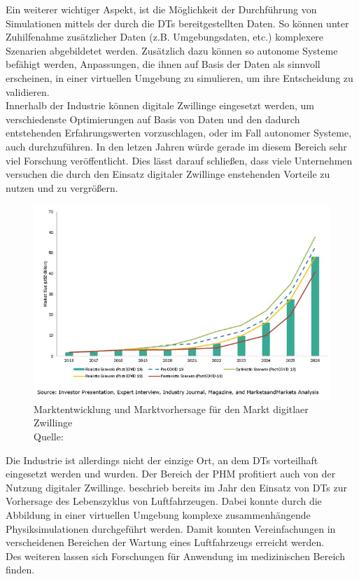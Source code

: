 Ein weiterer wichtiger Aspekt, ist die Möglichkeit der Durchführung von Simulationen mittels der durch die \ac{DT}s bereitgestellten Daten. So können unter Zuhilfenahme zusätzlicher Daten (z.B. Umgebungsdaten, etc.) komplexere Szenarien abgebildetet werden. Zusätzlich dazu können so autonome Systeme befähigt werden, Anpassungen, die ihnen auf Basis der Daten als sinnvoll erscheinen, in einer virtuellen Umgebung zu simulieren, um ihre Entscheidung zu validieren. \autocite{rosen2015importance}\\
Innerhalb der Industrie können digitale Zwillinge eingesetzt werden, um verschiedenste Optimierungen auf Basis von Daten und den dadurch entstehenden Erfahrungswerten vorzuschlagen, oder im Fall autonomer Systeme, auch durchzuführen. In den letzen Jahren würde gerade im diesem Bereich sehr viel Forschung veröffentlicht. \autocite[S. 167657]{barricelli2019survey} Dies lässt darauf schließen, dass viele Unternehmen versuchen die durch den Einsatz digitaler Zwillinge enstehenden Vorteile zu nutzen und zu vergrößern. 

\begin{figure}[h]
    \centering
    \includegraphics[width=1.0\linewidth]{img/digital-twin-market12.jpg}
    \caption[Übersicht Marktgröße \ac{DT}]{Marktentwicklung und Marktvorhersage für den Markt digitlaer Zwillinge \\Quelle: \citeauthor{markets2020} } 
\end{figure}


Die Industrie ist allerdings nicht der einzige Ort, an dem \ac{DT}s vorteilhaft eingesetzt werden und wurden. Der Bereich der \ac{PHM} profitiert auch von der Nutzung digitaler Zwillinge. \citeauthor{tuegel2011reengineering} beschrieb bereits im Jahr \citeyear{tuegel2011reengineering} den Einsatz von \ac{DT}s zur Vorhersage des Lebenszyklus von Luftfahrzeugen. Dabei konnte durch die Abbildung in einer virtuellen Umgebung komplexe zusammenhängende Physiksimulationen durchgeführt werden. Damit konnten Vereinfachungen in verscheidenen Bereichen der Wartung eines Luftfahrzeugs erreicht werden.\autocites{tao2018digital}{tuegel2011reengineering} \\
Des weiteren lassen sich Forschungen für Anwendung im medizinischen Bereich finden. \autocites{barricelli2019survey}{tao2018digital}

